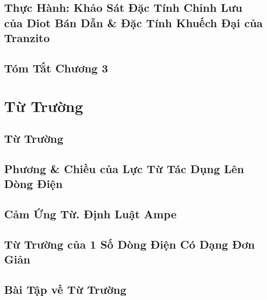 \documentclass[oneside]{book}
\numberwithin{equation}{section}
\begin{document}
\section{Thực Hành: Khảo Sát Đặc Tính Chỉnh Lưu của Diot Bán Dẫn \& Đặc Tính Khuếch Đại của Tranzito}


\section{Tóm Tắt Chương 3}


\chapter{Từ Trường}

\section{Từ Trường}


\section{Phương \& Chiều của Lực Từ Tác Dụng Lên Dòng Điện}


\section{Cảm Ứng Từ. Định Luật Ampe}


\section{Từ Trường của 1 Số Dòng Điện Có Dạng Đơn Giản}


\section{Bài Tập về Từ Trường}
\end{document}
